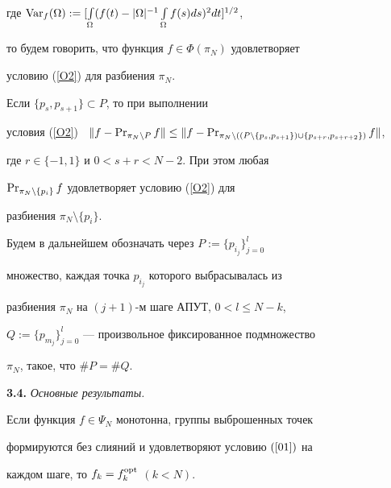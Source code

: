 где $\Var_f(\Omega):=[\int\limits_{\Omega}(f(t)-|\Omega|^{-1}


\int\limits_{\Omega}f(s)ds)^2 dt]^{1/2}$,


то будем говорить, что функция $f\in\Phi(\pi_N)$ удовлетворяет


условию (\ref{O2}) для разбиения $\pi_N$.





\begin{note}


Если $\{p_s, p_{s+1}\}\subset P$, то при выполнении


условия (\ref{O2}) \ $\|f-\PR_{\pi_N\setminus P}f\|\leq


\|f-\PR_{\pi_N \setminus


((P\setminus \{p_s, p_{s+1}\})\cup \{p_{s+r},p_{s+r+2}\})}f\|$,


где $r\in \{-1,1\}$ и $0<s+r<N-2$. При этом любая


$\operatorname{Pr}_{\pi_N\setminus\{p_i\}}f$ удовлетворяет условию (\ref{O2}) для


разбиения $\pi_N\setminus\{p_i\}$.


\end{note}





Будем в дальнейшем обозначать через $P:=\{p_{i_j}\}_{j=0}^{l}$ 


множество, каждая точка $p_{i_j}$ которого выбрасывалась из


разбиения $\pi_N$ на $(j+1)$-м шаге АПУТ, $0<l\leq N-k$,


$Q:=\{p_{m_j}\}_{j=0}^{l}$ --- произвольное фиксированное подмножество


$\pi_N$, такое, что $\#P=\#Q$.


\medskip





{\bf 3.4.} {\it Основные результаты.}





\begin{thm}\label{t1}


Если функция $f\in\Psi_N$ монотонна, группы выброшенных точек


формируются без слияний и удовлетворяют условию $(\ref {01})$ на


каждом шаге, то $f_k=f_k^{\operatorname{opt}}$ $(k<N)$.


\end{thm}






